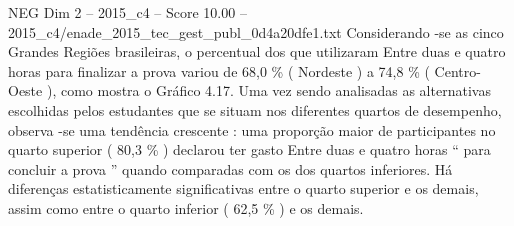 \begin{textsample}{NEG Dim 2 – 2015\_c4 – Score 10.00 – 2015\_c4/enade\_2015\_tec\_gest\_publ\_0d4a20dfe1.txt}
Considerando -se as cinco Grandes Regiões brasileiras, o percentual dos que utilizaram Entre duas e quatro horas para finalizar a prova variou de 68,0 \% ( Nordeste ) a 74,8 \% ( Centro-Oeste ), como mostra o Gráfico 4.17.
Uma vez sendo analisadas as alternativas escolhidas pelos estudantes que se situam nos diferentes quartos de desempenho, observa -se uma tendência crescente : uma proporção maior de participantes no quarto superior ( 80,3 \% ) declarou ter gasto Entre duas e quatro horas “ para concluir a prova ” quando comparadas com os dos quartos inferiores.
Há diferenças estatisticamente significativas entre o quarto superior e os demais, assim como entre o quarto inferior ( 62,5 \% ) e os demais.

\end{textsample}
